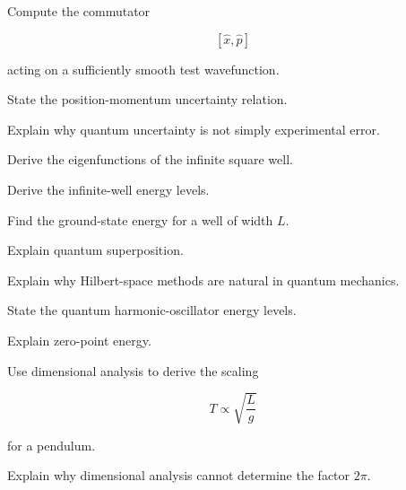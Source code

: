 \begin{exercise}[3]
Compute the commutator

\[
[\hat{x},\hat{p}]
\]

acting on a sufficiently smooth test wavefunction.
\end{exercise}

\begin{exercise}[2]
State the position-momentum uncertainty relation.
\end{exercise}

\begin{exercise}[3]
Explain why quantum uncertainty is not simply experimental error.
\end{exercise}

\begin{exercise}[3]
Derive the eigenfunctions of the infinite square well.
\end{exercise}

\begin{exercise}[3]
Derive the infinite-well energy levels.
\end{exercise}

\begin{exercise}[2]
Find the ground-state energy for a well of width \(L\).
\end{exercise}

\begin{exercise}[3]
Explain quantum superposition.
\end{exercise}

\begin{exercise}[3]
Explain why Hilbert-space methods are natural in quantum mechanics.
\end{exercise}

\begin{exercise}[2]
State the quantum harmonic-oscillator energy levels.
\end{exercise}

\begin{exercise}[3]
Explain zero-point energy.
\end{exercise}

\begin{exercise}[2]
Use dimensional analysis to derive the scaling

\[
T\propto\sqrt{\frac{L}{g}}
\]

for a pendulum.
\end{exercise}

\begin{exercise}[3]
Explain why dimensional analysis cannot determine the factor \(2\pi\).
\end{exercise}


